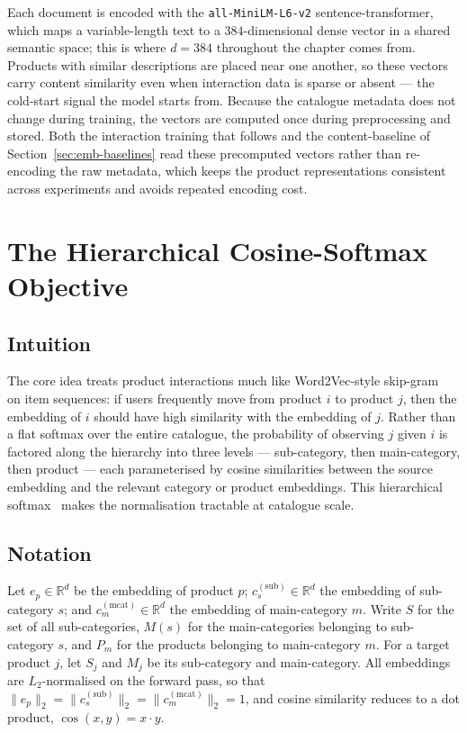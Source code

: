 Each document is encoded with the \texttt{all-MiniLM-L6-v2} sentence-transformer,
which maps a variable-length text to a $384$-dimensional dense vector in a shared
semantic space; this is where $d=384$ throughout the chapter comes from. Products
with similar descriptions are placed near one another, so these vectors carry
content similarity even when interaction data is sparse or absent --- the
cold-start signal the model starts from. Because the catalogue metadata does not
change during training, the vectors are computed once during preprocessing and
stored. Both the interaction training that follows and the content-baseline of
Section~\ref{sec:emb-baselines} read these precomputed vectors rather than
re-encoding the raw metadata, which keeps the product representations consistent
across experiments and avoids repeated encoding cost.

\section{The Hierarchical Cosine-Softmax Objective}
\label{sec:emb-model}

\subsection{Intuition}
The core idea treats product interactions much like Word2Vec-style
skip-gram~\cite{Mikolov13} on item sequences: if users frequently move from
product $i$ to product $j$, then the embedding of $i$ should have high
similarity with the embedding of $j$. Rather than a flat softmax over the
entire catalogue, the probability of observing $j$ given $i$ is factored along
the hierarchy into three levels --- sub-category, then main-category, then
product --- each parameterised by cosine similarities between the source
embedding and the relevant category or product embeddings. This hierarchical
softmax~\cite{Morin05} makes the normalisation tractable at catalogue scale.

\subsection{Notation}
Let $e_p \in \mathbb{R}^{d}$ be the embedding of product $p$;
$c^{(\text{sub})}_s \in \mathbb{R}^{d}$ the embedding of sub-category $s$; and
$c^{(\text{mcat})}_m \in \mathbb{R}^{d}$ the embedding of main-category $m$.
Write $S$ for the set of all sub-categories, $M(s)$ for the main-categories
belonging to sub-category $s$, and $P_m$ for the products belonging to
main-category $m$. For a target product $j$, let $S_j$ and $M_j$ be its
sub-category and main-category. All embeddings are $L_2$-normalised on the
forward pass, so that $\lVert e_p\rVert_2 = \lVert c^{(\text{sub})}_s\rVert_2 =
\lVert c^{(\text{mcat})}_m\rVert_2 = 1$, and cosine similarity reduces to a dot
product, $\cos(x,y) = x\cdot y$.

